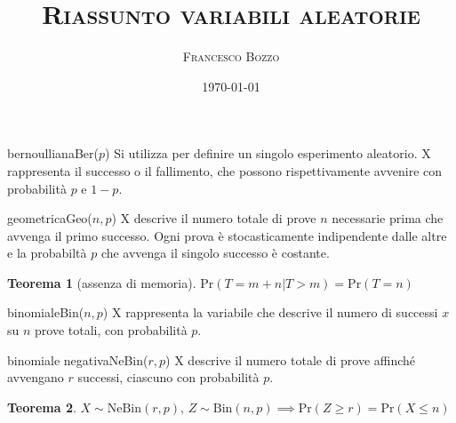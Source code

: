 \documentclass[
	,a4paper
	,12pt
	,oneside
]{article}
\title{\textsc{Riassunto variabili aleatorie}}
\author{\textsc{Francesco Bozzo}}
\date{\today}
\newtheorem*{theorem}{Teorema}
\begin{document}
\maketitle

\begin{aleatoria}{bernoulliana}{Ber(\(p\))}
	Si utilizza per definire un singolo esperimento aleatorio. X rappresenta il successo o il fallimento, che possono rispettivamente avvenire con probabilità \(p\) e \(1-p\).
\end{aleatoria}

\begin{aleatoria}{geometrica}{Geo(\(n, p\))}
	X descrive il numero totale di prove \(n\) necessarie prima che avvenga il primo successo. Ogni prova è stocasticamente indipendente dalle altre e la probabiltà \(p\) che avvenga il singolo successo è costante.

	\begin{theorem}[assenza di memoria]
		\(\text{Pr}(T=m+n|T>m) = \text{Pr}(T=n)\)
	\end{theorem}
\end{aleatoria}

\begin{aleatoria}{binomiale}{Bin(\(n, p\))}
	X rappresenta la variabile che descrive il numero di successi \(x\) su \(n\) prove totali, con probabilità \(p\).

\end{aleatoria}

\begin{aleatoria}{binomiale negativa}{NeBin(\(r, p\))}
	X descrive il numero totale di prove affinché avvengano \(r\) successi, ciascuno con probabilità \(p\).

	\begin{theorem}
		\(X\sim\text{NeBin}(r,p)\text{, } Z\sim\text{Bin}(n,p) \implies \text{Pr}(Z\geqslant r) = \text{Pr}(X\leqslant n)\)
	\end{theorem}
\end{aleatoria}
\end{document}
